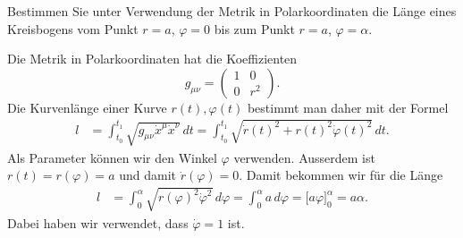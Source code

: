 Bestimmen Sie unter Verwendung der Metrik in Polarkoordinaten die
Länge eines Kreisbogens vom Punkt $r=a$, $\varphi=0$ bis
zum Punkt $r=a$, $\varphi=\alpha$.

\begin{loesung}
Die Metrik in Polarkoordinaten hat die Koeffizienten
\[
g_{\mu\nu}
=
\begin{pmatrix}
1&0\\0&r^2
\end{pmatrix}.
\]
Die Kurvenlänge einer Kurve $r(t), \varphi(t)$ bestimmt man daher mit
der Formel
\begin{align*}
l
&=
\int_{t_0}^{t_1}
\sqrt{g_{\mu\nu} \dot x^\mu \dot x^\nu}\,dt
=
\int_{t_0}^{t_1}
\sqrt{\dot r(t)^2 + r(t)^2\dot\varphi(t)^2}\,dt.
\end{align*}
Als Parameter können wir den Winkel $\varphi$ verwenden.
Ausserdem ist $r(t)=r(\varphi)=a$ und damit $\dot r(\varphi)=0$.
Damit bekommen wir für die Länge
\begin{align*}
l
&=
\int_0^{\alpha} \sqrt{r(\varphi)^2\dot \varphi^2}\,d\varphi
=
\int_0^{\alpha}
a
\,d\varphi
=
\bigl[a\varphi\bigr]_0^{\alpha}
=
a\alpha.
\end{align*}
Dabei haben wir verwendet, dass $\dot\varphi=1$ ist.
\end{loesung}

